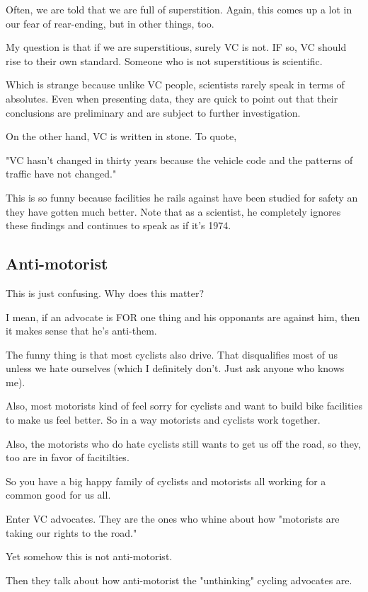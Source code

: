 Often, we are told that we are full of superstition. Again, this comes up a lot in our fear of rear-ending, but in other things, too.

My question is that if we are superstitious, surely VC is not. IF so, VC should rise to their own standard. Someone who is not superstitious is scientific.

Which is strange because unlike VC people, scientists rarely speak in terms of absolutes. Even when presenting data, they are quick to point out that their conclusions are preliminary and are subject to further investigation.

On the other hand, VC is written in stone. To quote,

"VC hasn't changed in thirty years because the vehicle code and the patterns of traffic have not changed."

This is so funny because facilities he rails against have been studied for safety an they have gotten much better. Note that as a scientist, he completely ignores these findings and continues to speak as if it's 1974.

\subsection{Anti-motorist}

This is just confusing. Why does this matter? 

I mean, if an advocate is FOR one thing and his opponants are against him, then it makes sense that he's anti-them.

The funny thing is that most cyclists also drive. That disqualifies most of us unless we hate ourselves (which I definitely don't. Just ask anyone who knows me).

Also, most motorists kind of feel sorry for cyclists and want to build bike facilities to make us feel better. So in a way motorists and cyclists work together.

Also, the motorists who do hate cyclists still wants to get us off the road, so they, too are in favor of facitilties.

So you have a big happy family of cyclists and motorists all working for a common good for us all.

Enter VC advocates. They are the ones who whine about how "motorists are taking our rights to the road." 

Yet somehow this is not anti-motorist.

Then they talk about how anti-motorist the "unthinking" cycling advocates are.

